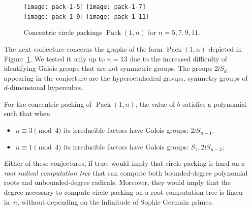 \documentclass[oribibl,10pt]{llncs}
\DeclareMathOperator{\Pack}{Pack}
\begin{document}
\begin{appendix}
\begin{figure}[t]
\centering
\texttt{[image: pack-1-5]}\hspace{1em}
\texttt{[image: pack-1-7]}\\
\vspace{1em}
\texttt{[image: pack-1-9]}\hspace{1em}
\texttt{[image: pack-1-11]}
\caption{Concentric circle packings $\Pack(1,n)$ for $n = 5,7,9,11$.}
\label{fig:pack1n}
\end{figure}

The next conjecture  concerns the graphs of the form $\Pack(1,n)$ depicted in Figure~\ref{fig:pack1n}. We tested it only up to $n = 13$ due to the increased difficulty of identifying Galois groups that are not symmetric groups. The groups $2\wr S_d$ appearing in the conjecture are the hyperoctahedral groups, symmetry groups of $d$-dimensional hypercubes.

\begin{conjecture}
For the concentric packing of $\Pack(1,n)$, the value of $b$ satisfies a polynomial such that when
\begin{itemize}
\item $n \equiv 3 \pmod{4}$ its irreducible factors have Galois groups: $2 \wr S_{n-1}$.
\item $n \equiv 1 \pmod{4}$ its irreducible factors have Galois groups: $S_1, 2 \wr S_{n-2}$;
\end{itemize}
\end{conjecture}

Either of these conjectures, if true, would imply that circle packing is hard on a \emph{root radical computation tree} that can compute both bounded-degree polynomial roots and unbounded-degree radicals. Moreover, they would imply that the degree necessary to compute circle packing on a root computation tree is linear in~$n$, without depending on the infinitude of Sophie Germain primes.

\newpage
{}

\end{appendix}
\end{document}
